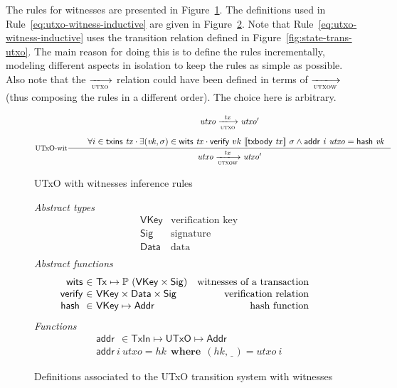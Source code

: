 \documentclass[11pt,a4paper]{article}
\newcommand{\powerset}[1]{\mathbb{P}~#1}
\newcommand{\var}[1]{\mathit{#1}}
\newcommand{\fun}[1]{\mathsf{#1}}
\newcommand{\type}[1]{\mathsf{#1}}
\newcommand{\trans}[2]{\xlongrightarrow[\textsc{#1}]{#2}}
\newcommand{\where}{~ ~ \mathbf{where}~ ~ }
\newcommand{\Tx}{\type{Tx}}
\newcommand{\Addr}{\type{Addr}}
\newcommand{\UTxO}{\type{UTxO}}
\newcommand{\TxIn}{\type{TxIn}}
\newcommand{\VKey}{\type{VKey}}
\newcommand{\Sig}{\type{Sig}}
\newcommand{\Data}{\type{Data}}
\newcommand{\txins}[1]{\fun{txins}~ \var{#1}}
\newcommand{\wits}[1]{\fun{wits}~ \var{#1}}
\newcommand{\verify}[3]{\fun{verify} ~ #1 ~ #2 ~ #3}
\newcommand{\serialised}[1]{\llbracket \var{#1} \rrbracket}
\newcommand{\addr}[2]{\fun{addr}~ \var{#1}~ \var{#2}}
\newcommand{\hash}[1]{\fun{hash}~ \var{#1}}
\newcommand{\txbody}[1]{\fun{txbody}~ \var{#1}}
\newcommand{\wcard}[0]{\underline{\phantom{a}}}
\begin{document}
The rules for witnesses are presented in Figure~\ref{fig:rules-utxo-witnesses}.
The definitions used in Rule~\ref{eq:utxo-witness-inductive} are given in
Figure~\ref{fig:state-trans-utxo-witnesses-defs}. Note that
Rule~\ref{eq:utxo-witness-inductive} uses the transition relation defined in
Figure~\ref{fig:state-trans-utxo}. The main reason for doing this is to define
the rules incrementally, modeling different aspects in isolation to keep the
rules as simple as possible. Also note that the $\trans{utxo}{}$ relation could
have been defined in terms of $\trans{utxow}{}$ (thus composing the rules in a
different order). The choice here is arbitrary.

\begin{figure}
  \begin{equation}
    \label{eq:utxo-witness-inductive}
    \inference[UTxO-wit]
    { \var{utxo} \trans{utxo}{tx} \var{utxo'}\\ ~ \\
      & \forall i \in \txins{tx} \cdot
           \exists (\var{vk}, \sigma) \in \wits{\var{tx}} \cdot
              \verify{vk}{\serialised{\txbody{tx}}}{\sigma}  \wedge \addr{i}{utxo} = \hash{vk}
    }
    {\var{utxo} \trans{utxow}{tx} \var{utxo'}}
  \end{equation}
  \caption{UTxO with witnesses inference rules}
  \label{fig:rules-utxo-witnesses}
\end{figure}

\begin{figure}
  \emph{Abstract types}
  \begin{align*}
    & \VKey & \text{verification key}\\
    & \Sig  & \text{signature}\\
    & \Data  & \text{data}\\
  \end{align*}
  \emph{Abstract functions}
  \begin{equation*}
    \begin{array}{r@{~\in~}lr}
      \fun{wits} & \Tx \mapsto \powerset{(\VKey \times \Sig)}
      & \text{witnesses of a transaction}\\
      \fun{verify} & \VKey \times \Data \times \Sig
      & \text{verification relation}\\
      \hash{} & \VKey \mapsto \Addr
      & \text{hash function} \\
    \end{array}
  \end{equation*}
  \emph{Functions}
  \begin{align*}
    & \addr{}{} \in \TxIn \mapsto \UTxO \mapsto \Addr\\
    & \addr{i}{utxo} = \var{hk} \where (hk, \wcard) = \var{utxo}~i
  \end{align*}
  \caption{Definitions associated to the UTxO transition system with witnesses}
  \label{fig:state-trans-utxo-witnesses-defs}
\end{figure}
\end{document}
